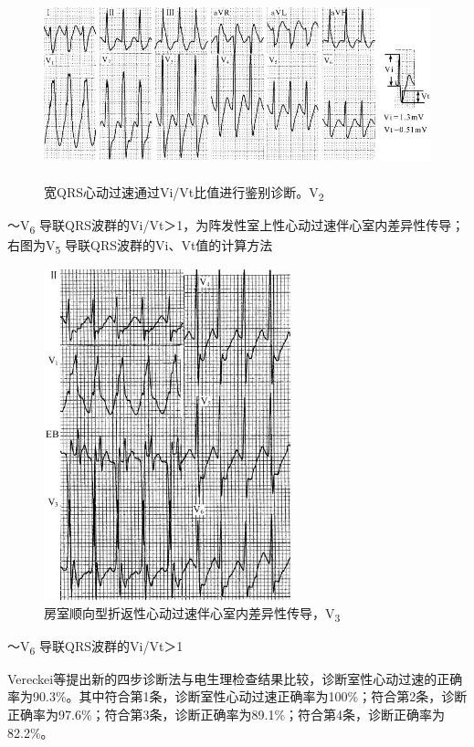 \begin{figure}[!htbp]
 \centering
 \includegraphics[width=5.5in,height=2.17708in]{./images/Image00514.jpg}
 \captionsetup{justification=centering}
 \caption{宽QRS心动过速通过Vi/Vt比值进行鉴别诊断。V\textsubscript{2}}
 \label{fig31-11}
  \end{figure} 
～V\textsubscript{6}
导联QRS波群的Vi/Vt＞1，为阵发性室上性心动过速伴心室内差异性传导；右图为V\textsubscript{5}
导联QRS波群的Vi、Vt值的计算方法

\begin{figure}[!htbp]
 \centering
 \includegraphics[width=2.8125in,height=3.77083in]{./images/Image00515.jpg}
 \captionsetup{justification=centering}
 \caption{房室顺向型折返性心动过速伴心室内差异性传导，V\textsubscript{3}}
 \label{fig31-12}
  \end{figure} 
～V\textsubscript{6} 导联QRS波群的Vi/Vt＞1

Vereckei等提出新的四步诊断法与电生理检查结果比较，诊断室性心动过速的正确率为90.3\%。其中符合第1条，诊断室性心动过速正确率为100\%；符合第2条，诊断正确率为97.6\%；符合第3条，诊断正确率为89.1\%；符合第4条，诊断正确率为82.2\%。

